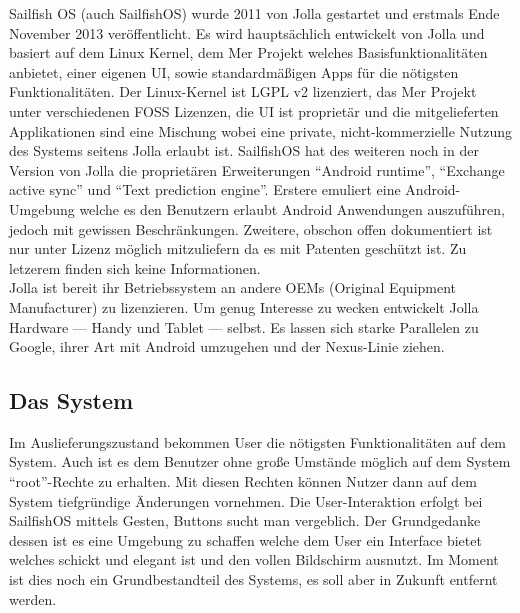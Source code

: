 Sailfish OS (auch \mbox{SailfishOS}) wurde 2011 von Jolla gestartet und erstmals Ende November 2013\cite{online:jolla-about} veröffentlicht. Es wird hauptsächlich entwickelt von Jolla und basiert auf dem Linux Kernel, dem Mer Projekt welches Basisfunktionalitäten anbietet, einer eigenen UI, sowie standardmäßigen Apps für die nötigsten Funktionalitäten\cite{online:sailfish-about}. Der Linux-Kernel ist LGPL v2 lizenziert\cite{online:kernel-license}, das Mer Projekt unter verschiedenen FOSS Lizenzen\cite{online:mer-license}, die UI ist proprietär und die mitgelieferten Applikationen sind eine Mischung\cite{online:sailfish-about} wobei eine private, nicht-kommerzielle Nutzung des Systems seitens Jolla erlaubt ist\cite{online:sailfish-eula}. \mbox{SailfishOS} hat des weiteren noch in der Version von Jolla die proprietären Erweiterungen ``Android runtime'', ``Exchange active sync'' und ``Text prediction engine''. Erstere emuliert eine Android-Umgebung welche es den Benutzern erlaubt Android Anwendungen auszuführen, jedoch mit gewissen Beschränkungen\cite{online:sailfish-android-runtime}. Zweitere, obschon offen dokumentiert ist nur unter Lizenz möglich mitzuliefern\cite{online:microsoft-eas} da es mit Patenten geschützt ist. Zu letzerem finden sich keine Informationen.\\
Jolla ist bereit ihr Betriebssystem an andere OEMs (Original Equipment Manufacturer) zu lizenzieren. Um genug Interesse zu wecken entwickelt Jolla Hardware --- Handy\cite{online:jolla-smartphone} und Tablet\cite{online:jolla-tablet} --- selbst. Es lassen sich starke Parallelen zu Google, ihrer Art mit Android umzugehen und der Nexus-Linie ziehen.\\

\subsection{Das System}
Im Auslieferungszustand bekommen User die nötigsten Funktionalitäten auf dem System. Auch ist es dem Benutzer ohne große Umstände möglich auf dem System ``root''-Rechte zu erhalten\cite{online:sailfish-root}. Mit diesen Rechten können Nutzer dann auf dem System tiefgründige Änderungen vornehmen. Die User-Interaktion erfolgt bei SailfishOS mittels Gesten, Buttons sucht man vergeblich. Der Grundgedanke dessen ist es eine Umgebung zu schaffen welche dem User ein Interface bietet welches schickt und elegant ist und den vollen Bildschirm ausnutzt\cite{online:sailfish-ui}. Im Moment ist dies noch ein Grundbestandteil des Systems, es soll aber in Zukunft entfernt werden\cite{online:sailfish-about}.

